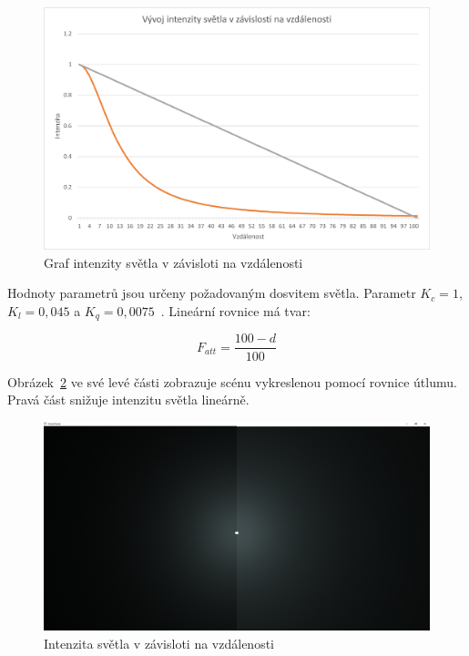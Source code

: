 \documentclass[thesis=M,czech]{FITthesis}[2019/12/23]
\begin{document}
\begin{figure}\centering
	\includegraphics[width=\textwidth]{images/lum}
	\caption[Graf intenzity světla v závisloti na vzdálenosti]{Graf intenzity světla v závisloti na vzdálenosti}\label{fig:lum}
\end{figure}

Hodnoty parametrů jsou určeny požadovaným dosvitem světla. Parametr $K_c = 1$, $K_l = 0,045$ a $K_q = 0,0075$~\cite{ogre_att}. Lineární rovnice má tvar:

$$ F_{att} = \frac{100 - d}{100} $$

Obrázek~\ref{fig:light} ve své levé části zobrazuje scénu vykreslenou pomocí rovnice útlumu. Pravá část snižuje intenzitu světla lineárně.


\begin{figure}\centering
	\includegraphics[width=\textwidth]{images/light}
	\caption[Intenzita světla v závisloti na vzdálenosti]{Intenzita světla v závisloti na vzdálenosti}\label{fig:light}
\end{figure}
\end{document}
